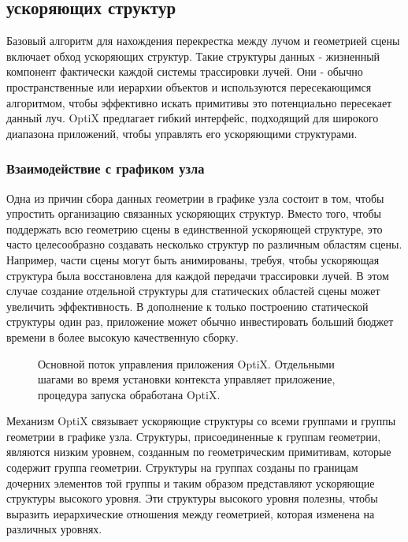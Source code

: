 \subsection{ускоряющих структур}
Базовый алгоритм для нахождения перекрестка между лучом и геометрией сцены включает обход ускоряющих структур. Такие структуры данных - жизненный компонент фактически каждой системы трассировки лучей. Они - обычно пространственные или иерархии объектов и используются пересекающимся алгоритмом, чтобы эффективно искать примитивы
это потенциально пересекает данный луч. OptiX предлагает гибкий интерфейс, подходящий для широкого диапазона приложений, чтобы управлять его ускоряющими структурами.
\subsubsection{Взаимодействие с графиком узла}
Одна из причин сбора данных геометрии в графике узла состоит в том, чтобы упростить организацию связанных ускоряющих структур. Вместо того, чтобы поддержать всю геометрию сцены в единственной ускоряющей структуре, это часто целесообразно создавать несколько структур по различным областям сцены. Например, части сцены могут быть анимированы, требуя, чтобы ускоряющая структура была восстановлена для каждой передачи трассировки лучей. В этом случае создание отдельной структуры для статических областей сцены может увеличить эффективность. В дополнение к только построению статической структуры один раз, приложение может обычно инвестировать больший бюджет времени в более высокую качественную сборку.

\begin{figure}[h!]
\caption{Основной поток управления приложения OptiX. Отдельными шагами во время установки контекста управляет приложение, процедура запуска обработана OptiX.}
\label{fig2}
\end{figure}
  Механизм OptiX связывает ускоряющие структуры со всеми группами и группы геометрии в графике узла. Структуры, присоединенные к группам геометрии, являются низким уровнем, созданным по геометрическим примитивам, которые содержит группа геометрии. Структуры на группах созданы по границам дочерних элементов той группы и таким образом представляют ускоряющие структуры высокого уровня. Эти структуры высокого уровня полезны, чтобы выразить иерархические отношения между геометрией, которая изменена на различных уровнях. 
  
